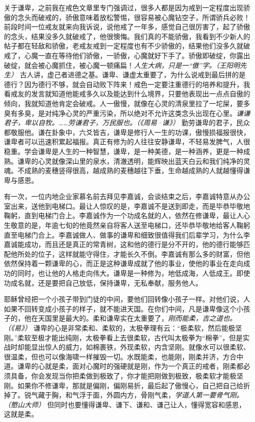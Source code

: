 关于谦卑，之前我在戒色文章里专门强调过，很多人都是因为戒到一定程度出现骄傲的念头而破戒的，骄傲意味着放松警惕，很容易被心魔钻空子，所谓骄兵必败！前段时间一位戒友就来向我诉说，说他戒了一年多，感觉自己很厉害了，起了骄傲的念头，结果没多久就破戒了，他很懊悔。我们真的不能骄傲，我看到不少新人的帖子都在轻敌和骄傲，老戒友戒到一定程度也有不少骄傲的，结果他们没多久就破戒了，心魔一直在等待他们骄傲，一骄傲，心魔就好下手了。骄傲即破绽，你露出破绽，就会被心魔抓住，被心魔一顿痛扁！\textit{人生大病，只是一“傲”字。（王阳明先生）} 古人讲，虚己者进德之基。谦卑、谦虚太重要了，为什么说戒到最后拼的是德行？因为德行不够，就会自动败下阵来！戒色一定要注重德行的培养和提升，我看戒友的发言就知道他能戒多久以及能达到什么境界，只要他表现出一点点自傲的倾向，我就知道他肯定会破戒。人一傲慢，就像在心灵的清泉里拉了一坨屎，要多臭有多臭，是对纯净心灵的严重污染，所以绝对不允许这类念头出现在心里。\textit{谦谦君子，卑以自牧。……劳谦君子，万民服也。（《周易·谦》）} 勤劳谦卑的君子，民众都敬服他。谦在卦象中，六爻皆吉，谦卑是修行人一生的功课，傲慢损福报很快，谦卑者可以迅速积累起福报。真正有修为的人往往安静谦卑，不轻易发脾气，人很稳重。学会谦卑是人生的一种智慧，谦卑，是一种美德，是一种涵养，更是一种成熟。谦卑的心灵就像深山里的泉水，清澈透明，能辉映出蓝天白云和我们纯净的灵魂。不成熟的麦穗竖得很高，越成熟的麦穗越往下垂，生命越成熟的人就越懂得谦卑与感恩。

有一次，一位内地企业家慕名前去拜见李嘉诚，会谈结束之后，李嘉诚特意从办公室出来，送他到电梯口。最让人惊叹的是，李嘉诚不是送到即走，而是毕恭毕敬地鞠躬，直到电梯门合上。李嘉诚作为一个功成名就的人，依然在修谦卑，最让人心生敬意的是，年逾七旬的他竟然亲自将客人送至电梯口，还毕恭毕敬地给客人鞠躬直至电梯门合上。李嘉诚做人、做事的谦卑和细致很值得我们后辈学习，为什么李嘉诚能成功，而且还是真正的常青树，这和他的德行是分不开的，他的德行能够匹配他所处的位子，这样就能守得住，才能长久不倒。李嘉诚有那么多的财富，但他依然保持着一颗谦卑的心，而正是这种谦卑成就了他的事业，使他的事业在走向成功的同时，也让他的人格走向伟大。谦卑是一种修为，地低成海，人低成王。即使功成名就，还是要把自己放低，保持谦卑，无私奉献，服务他人。

耶稣曾经把一个小孩子带到门徒的中间，要他们回转像小孩子一样。对他们说，人如果不回转变成小孩子的样子，就不能进天国。在你们中间，凡是谦卑像这个小孩子的，他在天国里是最大的。柔和谦卑实在太重要了，\textit{刚而能柔，吉之道也。（《易》）} 谦卑的心是非常柔和、柔软的，太极拳理有云：“极柔软，然后能极坚刚。”柔软至极才能出纯刚，太极拳看上去很柔软，古代叫太极拳为“棉拳”，但是实战时却能显出惊人的威力，如棉裹铁，外现柔软，内含坚刚。就像水可以很柔软、很温柔，但也可以像海啸一样摧毁一切。水既能柔，也能刚，刚柔并济，方合中道。谦卑的心就是柔，面对心魔时的强硬就是刚，作为一个真正的戒者，刚柔都必须具备，你会发现当你把柔做到极致了，你才能把刚做到极致，极柔软才能极坚刚。如果你不修谦卑，那就是偏刚，偏刚易折，最后起了傲慢心，自己把自己给折掉了。锐气藏于胸，和气浮于面，外圆内方，骨刚气柔，\textit{学道人第一要骨气刚。（憨山大师）} 但同时也要懂得谦卑、谦下、谦和、谦己让人，懂得宽容和感恩，这就是柔。

